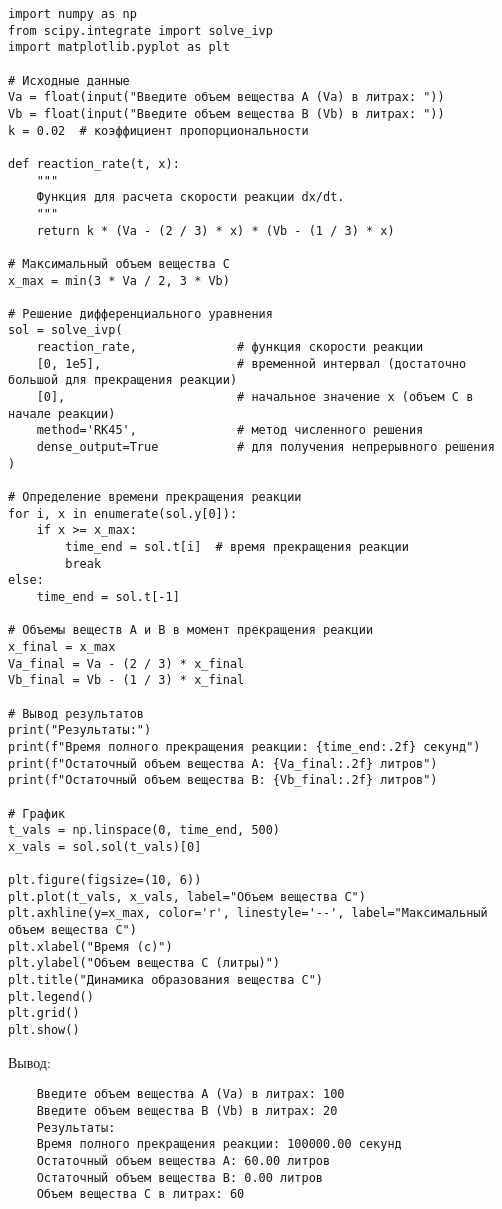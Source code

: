 \begin{verbatim}
import numpy as np
from scipy.integrate import solve_ivp
import matplotlib.pyplot as plt

# Исходные данные
Va = float(input("Введите объем вещества A (Va) в литрах: "))
Vb = float(input("Введите объем вещества B (Vb) в литрах: "))
k = 0.02  # коэффициент пропорциональности

def reaction_rate(t, x):
    """
    Функция для расчета скорости реакции dx/dt.
    """
    return k * (Va - (2 / 3) * x) * (Vb - (1 / 3) * x)

# Максимальный объем вещества C
x_max = min(3 * Va / 2, 3 * Vb)

# Решение дифференциального уравнения
sol = solve_ivp(
    reaction_rate,              # функция скорости реакции
    [0, 1e5],                   # временной интервал (достаточно большой для прекращения реакции)
    [0],                        # начальное значение x (объем C в начале реакции)
    method='RK45',              # метод численного решения
    dense_output=True           # для получения непрерывного решения
)

# Определение времени прекращения реакции
for i, x in enumerate(sol.y[0]):
    if x >= x_max:
        time_end = sol.t[i]  # время прекращения реакции
        break
else:
    time_end = sol.t[-1]

# Объемы веществ A и B в момент прекращения реакции
x_final = x_max
Va_final = Va - (2 / 3) * x_final
Vb_final = Vb - (1 / 3) * x_final

# Вывод результатов
print("Результаты:")
print(f"Время полного прекращения реакции: {time_end:.2f} секунд")
print(f"Остаточный объем вещества A: {Va_final:.2f} литров")
print(f"Остаточный объем вещества B: {Vb_final:.2f} литров")

# График
t_vals = np.linspace(0, time_end, 500)
x_vals = sol.sol(t_vals)[0]

plt.figure(figsize=(10, 6))
plt.plot(t_vals, x_vals, label="Объем вещества C")
plt.axhline(y=x_max, color='r', linestyle='--', label="Максимальный объем вещества C")
plt.xlabel("Время (с)")
plt.ylabel("Объем вещества C (литры)")
plt.title("Динамика образования вещества C")
plt.legend()
plt.grid()
plt.show()
\end{verbatim}

Вывод:

\begin{verbatim}
    Введите объем вещества A (Va) в литрах: 100
    Введите объем вещества B (Vb) в литрах: 20
    Результаты:
    Время полного прекращения реакции: 100000.00 секунд
    Остаточный объем вещества A: 60.00 литров
    Остаточный объем вещества B: 0.00 литров
    Объем вещества C в литрах: 60
\end{verbatim}